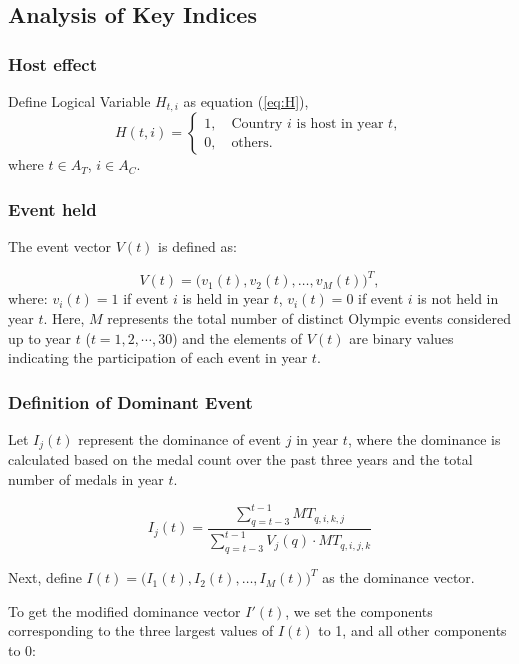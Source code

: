 \documentclass{mcmthesis}
\begin{document}
	\subsection{Analysis of Key Indices}
	\subsubsection{Host effect}
	
	Define Logical Variable $H_{t,i}$ as equation (\ref{eq:H}),
	\begin{equation}
		H(t,i)=
		\begin{cases}
			1, \quad \text{Country } i \text{ is host in year } t, \\
			0, \quad \text{others}.
		\end{cases}
		\label{eq:H}
	\end{equation}
	where $t\in A_{T}$, $i\in A_{C}$.
	
	
	
	\subsubsection{Event held}
	The event vector \( V(t) \) is defined as:
	
	\[
	V(t) = \big( v_1(t), v_2(t), \dots, v_M(t) \big)^T,
	\]
	where: \( v_i(t) = 1 \) if event \( i \) is held in year \( t \),
	\( v_i(t) = 0 \) if event \( i \) is not held in year \( t \). Here, \( M \) represents the total number of distinct Olympic events considered up to year \( t \) ($t=1,2,\cdots,30$) and the elements of \( V(t) \) are binary values indicating the participation of each event in year \( t \).
	
	
	
\subsubsection{Definition of Dominant Event}

Let \( I_j(t) \) represent the dominance of event \( j \) in year \( t \), where the dominance is calculated based on the medal count over the past three years and the total number of medals in year \( t \).

\[
I_j(t) = \frac{\sum_{q=t-3}^{t-1} MT_{q,i,k,j}}{\sum_{q=t-3}^{t-1} V_j(q) \cdot MT_{q,i,j,k}} 
\]

Next, define \( I(t) = \big( I_1(t), I_2(t), \dots, I_M(t) \big)^T \) as the dominance vector. 

To get the modified dominance vector \( I'(t) \), we set the components corresponding to the three largest values of \( I(t) \) to 1, and all other components to 0:
\end{document}
